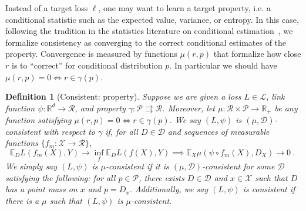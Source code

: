 \documentclass{article} %
\newcommand{\Comments}{0}
\newcommand{\mytodo}[2]{\ifnum\Comments=1%
	\todo[linecolor=#1!80!black,backgroundcolor=#1,bordercolor=#1!80!black]{#2}\fi}
\newcommand{\raft}[1]{\mytodo{green!20!white}{RF: #1}}
\newcommand{\botodo}[1]{\mytodo{blue!20!white}{[Bo: #1]}}
\newcommand{\btw}[1]{}%
\newcommand{\reals}{\mathbb{R}}
\newcommand{\propdis}{\mu}
\newcommand{\D}{\mathcal{D}}
\newcommand{\E}{\mathbb{E}}
\renewcommand{\L}{\mathcal{L}}
\newcommand{\R}{\mathcal{R}}
\renewcommand{\P}{\mathcal{P}}
\newcommand{\X}{\mathcal{X}}
\newcommand{\Y}{\mathcal{Y}}
\newcommand{\Ind}[1]{\mathbf{I}\{{#1}\}}
\newcommand{\toto}{\rightrightarrows}
\newtheorem{definition}{Definition}
\begin{document}


Instead of a target loss $\ell$, one may want to learn a target property, i.e. a conditional statistic such as the expected value, variance, or entropy.
In this case, following the tradition in the statistics literature on conditional estimation~\citep{gyorfi2006distribution,fan1998efficient,ruppert1997local},
we formalize consistency as converging to the correct conditional estimates of the property.
Convergence is measured by functions $\propdis(r, p)$ that formalize how close $r$ is to ``correct'' for conditional distribution $p$.
In particular we should have $\propdis(r,p) = 0 \iff r \in \gamma(p)$.
\btw{Bo: Would be nice to give some natural special cases: for a finite property, $\propdis(r,p) = \Ind{r \in \gamma(p)}$, and for single-valued properties with a distance metric on $\R$, $\propdis(r,p) = \text{dist}(r, \gamma(p))$.}

\begin{definition}[Consistent: property]\label{def:consistent-prop}
	Suppose we are given a loss $L \in \L$, link function $\psi: \reals^d \to \R$, and property $\gamma:\P \toto \R$.
	Moreover, let $\propdis : \R \times \P \to \reals_+$ be any function satisfying $\propdis(r,p) = 0 \iff r \in \gamma(p)$.
	We say $(L, \psi)$ is \emph{$(\propdis, \D)$-consistent with respect to} $\gamma$ if, for all $D \in \D$ and sequences of measurable functions $\{f_m: \X \to \R\}$, 
	\begin{equation}
	\E_{D} L(f_m(X), Y) \to \inf_f \E_{D} L( f(X), Y) \implies \E_X \propdis(\psi \circ f_m(X), D_X) \to 0~.~
	\end{equation}
	We simply say $(L,\psi)$ is \emph{$\propdis$-consistent} if it is $(\propdis,\D)$-consistent for some $\D$ satisfying the following: for all $p \in \P$, there exists $D \in \D$ and $x \in \X$ such that $D$ has a point mass on $x$ and $p = D_x$.
	Additionally, we say $(L,\psi)$ is \emph{consistent} if there is a $\propdis$ such that $(L,\psi)$ is $\propdis$-consistent.
\end{definition}
\end{document}
